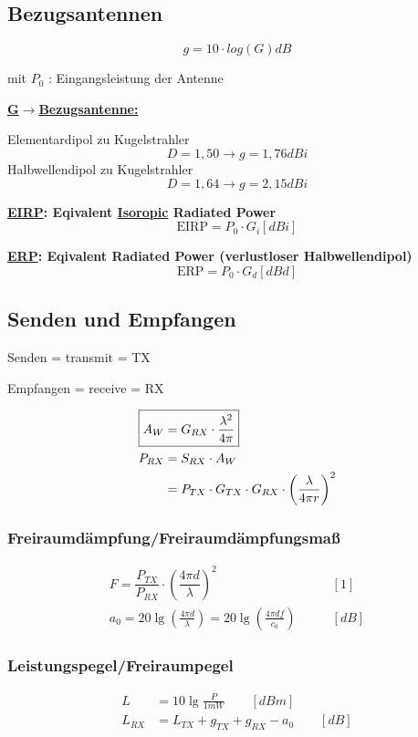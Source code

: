 \subsection{Bezugsantennen}
\[
    \boxed{g = 10 \cdot log(G) \si{dB}}
\]

mit $P_0$ : Eingangsleistung der Antenne

\begin{description}
    \item \textbf{\underline{G$\rightarrow$Bezugsantenne:}}

          Elementardipol  zu Kugelstrahler \[D = 1,50 \rightarrow g = 1,76\si{dBi}\]
          Halbwellendipol zu Kugelstrahler \[D = 1,64 \rightarrow g = 2,15\si{dBi}\]

    \item \textbf{\underline{EIRP}: Eqivalent \underline{Isoropic} Radiated Power}
          \[
              \text{EIRP} = P_0 \cdot G_i [\si{dBi}]
          \]

    \item \textbf{\underline{ERP}: Eqivalent Radiated Power (verlustloser Halbwellendipol)}
          \[
              \text{ERP} = P_0 \cdot G_d [\si{dBd}]
          \]
\end{description}

\subsection{Senden und Empfangen}
\begin{description}
    \item Senden = transmit = TX
    \item Empfangen = receive = RX
\end{description}

\begin{align*}
    \Aboxed{A_W & = G_{RX}\cdot\frac{\lambda^2}{4\pi}}                                     \\
    P_{RX}      & = S_{RX}\cdot A_W                                                        \\
                & = P_{TX}\cdot G_{TX}\cdot G_{RX}\cdot \left(\frac{\lambda}{4\pi r}\right)^2
\end{align*}

\subsubsection{Freiraumdämpfung/Freiraumdämpfungsmaß}
\begin{align*}
    F = \dfrac{P_{TX}}{P_{RX}} \cdot \left(\dfrac{4 \pi d}{\lambda}\right)^2 &\qquad [1] \\ 
    a_{0} = 20 \lg \left(\frac{4 \pi d}{\lambda}\right) =20 \lg \left(\frac{4 \pi d f}{c_{0}}\right)   &\qquad [\si{dB}]
\end{align*}

\subsubsection{Leistungspegel/Freiraumpegel}
\begin{align*}  
    L &= 10 \lg \frac{P}{1 mW} \qquad [\si{dBm}] \\
    L_{RX} &= L_{TX}+g_{TX}+g_{RX}-a_{0} \qquad [\si{dB}]
\end{align*}